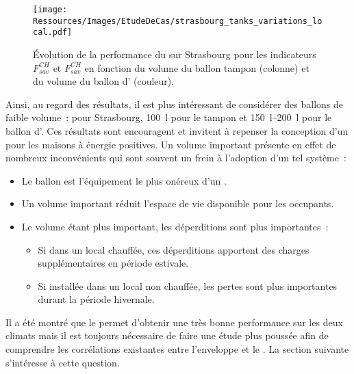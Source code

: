 \begin{figure}
    \centering
    \texttt{[image: Ressources/Images/EtudeDeCas/strasbourg\_tanks\_variations\_local.pdf]}
    \caption[Évolution de la performance du  par secteur en fonction du volume des ballons sur Strasbourg.]
             {Évolution de la performance du  sur Strasbourg pour les indicateurs $F_{sav}^{CH}$
              et $F_{sav}^{CH}$ en fonction du volume du ballon tampon (colonne) et
              du volume du ballon d’ (couleur).}
    \label{fig:tanks_variations_locales_strasbourg}
\end{figure}


Ainsi, au regard des résultats, il est plus intéressant de considérer des ballons
de faible volume~: pour Strasbourg, \SI{100}{\litre} pour le tampon et \SIrange{150}{200}{\litre} pour le ballon d’.
Ces résultats sont encouragent et invitent à repenser la conception d’un  pour
les maisons à énergie positives.
Un volume important présente en effet de nombreux inconvénients qui sont souvent un frein
à l’adoption d’un tel système~:
\begin{itemize}
    \item Le ballon est l’équipement le plus onéreux d’un .
    \item Un volume important réduit l’espace de vie disponible pour les occupants.
    \item Le volume étant plus important, les déperditions sont plus importantes~:
    \begin{itemize}
        \item Si dans un local chauffée, ces déperditions apportent des charges supplémentaires
              en période estivale.
        \item Si installée dans un local non chauffée, les pertes sont plus importantes
              durant la période hivernale.
    \end{itemize}
\end{itemize}

Il a été montré que le  permet d’obtenir une très bonne performance sur les deux
climats mais il est toujours nécessaire de faire une étude plus poussée afin de comprendre
les corrélations existantes entre l’enveloppe et le . La section suivante
s’intéresse à cette question.



